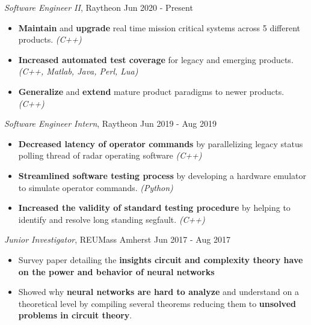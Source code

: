 \documentclass[a4paper,12pt]{memoir}
\begin{document}
\userinformation
\framebreak



\CVItem
	{\textit{Software Engineer II}, Raytheon \hfill Jun 2020 - Present}
	{
		\begin{itemize}
			\item \textbf{Maintain} and \textbf{upgrade} real time mission critical systems across 5 different products. \textit{(C++)}
			\item \textbf{Increased automated test coverage} for legacy and emerging products. \textit{(C++, Matlab, Java, Perl, Lua)}
			\item \textbf{Generalize} and \textbf{extend} mature product paradigms to newer products. \textit{(C++)}
		\end{itemize}
	}

\CVItem
	{\textit{Software Engineer Intern}, Raytheon \hfill Jun 2019 - Aug 2019}
	{
		\begin{itemize}
			\item \textbf{Decreased latency of operator commands} by parallelizing legacy status polling thread of radar operating software \textit{(C++)}
			\item \textbf{Streamlined software testing process} by developing a hardware emulator to simulate operator commands. \textit{(Python)}
			\item \textbf{Increased the validity of standard testing procedure} by helping to identify and resolve long standing segfault. \textit{(C++)}
		\end{itemize}
	}

\CVItem
	{\textit{Junior Investigator}, REUMass Amherst \hfill Jun 2017 - Aug 2017}
	{
		\begin{itemize}
			\item Survey paper detailing the \textbf{insights circuit and complexity theory have on the power and behavior of neural networks}
			\item Showed why \textbf{neural networks are hard to analyze} and understand on a theoretical level by compiling several theorems reducing them to \textbf{unsolved problems in circuit theory}.
		\end{itemize}
	}

\Sep

\end{document}
